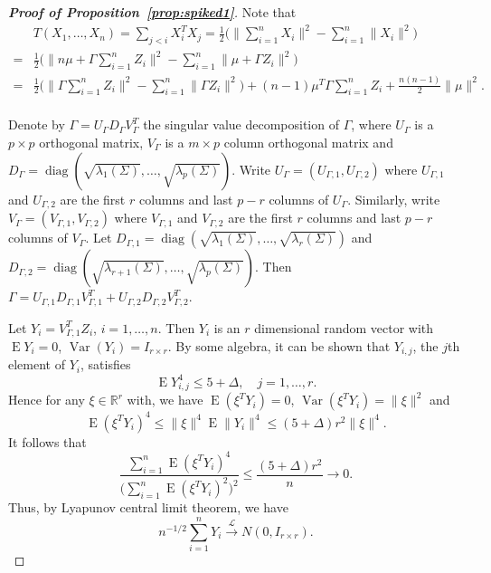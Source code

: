 \documentclass[review]{elsarticle}
\DeclareMathOperator{\mydiag}{diag}
\DeclareMathOperator{\myE}{E}
\DeclareMathOperator{\myVar}{Var}
\theoremstyle{plain}
\theoremstyle{definition}
\theoremstyle{remark}
\begin{document}
\begin{proof}[\textbf{Proof of Proposition~\ref{prop:spiked1}}]
    Note that
    $$
    \begin{aligned}
        &T(X_1,\ldots,X_n)=\sum_{j<i} X_i^T X_j
        = \frac{1}{2}\Big(\big\|\sum_{i=1}^n X_i \big\|^2-\sum_{i=1}^n \| X_i \|^2\Big)\\
        =&
        \frac{1}{2}\Big(\big\|n\mu+\Gamma\sum_{i=1}^n Z_i \big\|^2-\sum_{i=1}^n \| \mu+\Gamma Z_i \|^2\Big)\\
        =&
        \frac{1}{2}\Big(\big\|\Gamma\sum_{i=1}^n Z_i \big\|^2-\sum_{i=1}^n \| \Gamma Z_i \|^2\Big)+(n-1)\mu^T \Gamma \sum_{i=1}^n Z_i+\frac{n(n-1)}{2}\|\mu\|^2.\\
    \end{aligned}
    $$



    Denote by $\Gamma= U_{\Gamma}D_{\Gamma}V_{\Gamma}^T$ the singular value decomposition of $\Gamma$, where $U_{\Gamma}$ is a $p\times p$ orthogonal matrix, $V_{\Gamma}$ is a $m\times p$ column orthogonal matrix and $D_{\Gamma}=\mydiag(\sqrt{\lambda_1(\Sigma)},\ldots,\sqrt{\lambda_p(\Sigma)})$.
    Write $U_{\Gamma}=(U_{\Gamma,1},U_{\Gamma,2})$ where $U_{\Gamma,1}$ and $U_{\Gamma,2}$ are the first $r$ columns and last $p-r$ columns of $U_{\Gamma}$.
    Similarly, write $V_{\Gamma}=(V_{\Gamma,1},V_{\Gamma,2})$ where $V_{\Gamma,1}$ and $V_{\Gamma,2}$ are the first $r$ columns and last $p-r$ columns of $V_{\Gamma}$.
    Let $D_{\Gamma,1}=\mydiag(\sqrt{\lambda_1(\Sigma)},\ldots,\sqrt{\lambda_r(\Sigma)})$ and $D_{\Gamma,2}=\mydiag(\sqrt{\lambda_{r+1}(\Sigma)},\ldots,\sqrt{\lambda_p(\Sigma)})$.
    Then $\Gamma = U_{\Gamma,1}D_{\Gamma,1}V_{\Gamma,1}^T+U_{\Gamma,2}D_{\Gamma,2}V_{\Gamma,2}^T$.


    Let $Y_i=V_{\Gamma,1}^T Z_i$, $i=1,\ldots,n$.
    Then $Y_i$ is an $r$ dimensional random vector with $\myE Y_i=0$, $\myVar (Y_i)=I_{r\times r}$.
    By some algebra, it can be shown that $Y_{i,j}$, the $j$th  element of $Y_i$, satisfies
    $$
    \myE Y_{i,j}^4\leq 5+\Delta, \quad
j=1,\ldots,r.
    $$
    Hence for any $\xi\in\mathbb{R}^r$ with, we have $\myE (\xi^T Y_i)=0$, $\myVar (\xi^T Y_i)=\|\xi\|^2$ and
    $$
    \myE (\xi^T Y_{i})^4 
    \leq \|\xi\|^4\myE \|Y_{i}\|^4 \leq (5+\Delta)r^2 \|\xi\|^4.
    $$
    It follows that
    $$
    \frac{
        \sum_{i=1}^n \myE (\xi^T Y_{i})^4 
    }{
        \big(\sum_{i=1}^n \myE (\xi^T Y_{i})^2 \big)^2
    }
    \leq
    \frac{(5+\Delta)r^2 }{n}\to 0.
    $$
    Thus, by Lyapunov central limit theorem, we have
    $$
    n^{-1/2}\sum_{i=1}^n Y_i\xrightarrow{\mathcal{L}} N(0,I_{r\times r}).
    $$

\end{proof}
\end{document}
